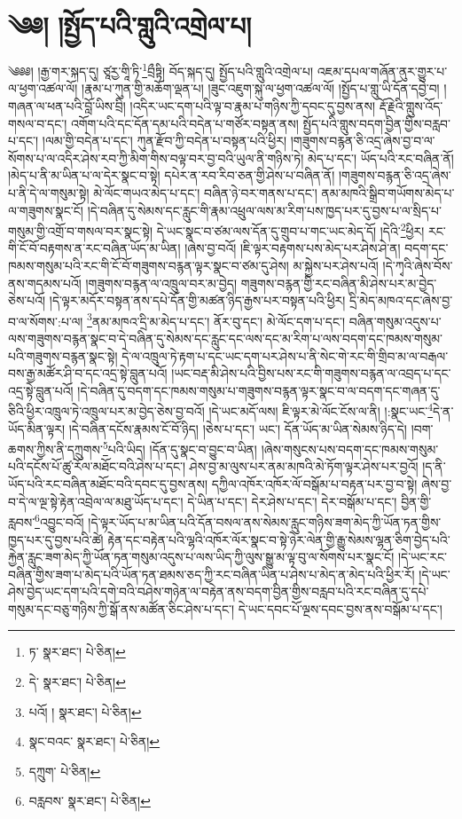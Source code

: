 \setcounter{footnote}{0} 
\chapter{༄༅། །སྤྱོད་པའི་གླུའི་འགྲེལ་པ།}༄༅༅། །རྒྱ་གར་སྐད་དུ། ཙཱརྱ་གཱི་ཏི་\footnote{ཏ་  སྣར་ཐང་།  པེ་ཅིན། }བྲྀཏྟི། བོད་སྐད་དུ། སྤྱོད་པའི་གླུའི་འགྲེལ་པ། འཇམ་དཔལ་གཞོན་ནུར་གྱུར་པ་ལ་ཕྱག་འཚལ་ལོ། །རྣམ་པ་ཀུན་གྱི་མཆོག་ལྡན་པ། །ཟུང་འཇུག་སྐུ་ལ་ཕྱག་འཚལ་ལོ། །སྤྱོད་པ་གླུ་ཡི་དོན་དབྱེ་བ། །གཞན་ལ་ཕན་པའི་བློ་ཡིས་བྲི། །འདིར་ཡང་དག་པའི་ལྟ་བ་རྣམ་པ་གཉིས་ཀྱི་དབང་དུ་བྱས་ནས། རྡོ་རྗེའི་གླུས་འོད་གསལ་བ་དང་། འགོག་པའི་དང་དོན་དམ་པའི་བདེན་པ་གཙོར་བསྟན་ནས། སྤྱོད་པའི་གླུས་བདག་བྱིན་གྱིས་བརླབ་པ་དང་། །ལམ་གྱི་བདེན་པ་དང་། ཀུན་རྫོབ་ཀྱི་བདེན་པ་བསྟན་པའི་ཕྱིར། །གཟུགས་བརྙན་ཅི་འདྲ་ཞེས་བྱ་བ་ལ་སོགས་པ་ལ་འདིར་ཤེས་རབ་ཀྱི་མིག་གིས་བལྟ་བར་བྱ་བའི་ཡུལ་ནི་གཉིས་ཏེ། མེད་པ་དང་། ཡོད་པའི་རང་བཞིན་ནོ། །མེད་པ་ནི་མ་ཡིན་པ་ལ་དེར་སྣང་བ་སྟེ། དཔེར་ན་རབ་རིབ་ཅན་གྱི་ཤེས་པ་བཞིན་ནོ། །གཟུགས་བརྙན་ཅི་འདྲ་ཞེས་པ་ནི་དེ་ལ་གསུམ་སྟེ། མེ་ལོང་གཡའ་མེད་པ་དང་། བཞིན་ཉེ་བར་གནས་པ་དང་། ནམ་མཁའི་སྒྲིབ་གཡོགས་མེད་པ་ལ་གཟུགས་སྣང་ངོ། །དེ་བཞིན་དུ་སེམས་དང་རླུང་གི་རྣམ་འཕྲུལ་ལས་མ་རིག་པས་ཁྱད་པར་དུ་བྱས་པ་ལ་སྲིད་པ་གསུམ་གྱི་འགྲོ་བ་གསལ་བར་སྣང་སྟེ། དེ་ཡང་སྣང་བ་ཙམ་ལས་དོན་དུ་གྲུབ་པ་གང་ཡང་མེད་དོ། །དེའི་\footnote{དེ་  སྣར་ཐང་།  པེ་ཅིན། }ཕྱིར། རང་གི་ངོ་བོ་བརྟགས་ན་རང་བཞིན་ཡོད་མ་ཡིན། །ཞེས་བྱ་བའོ། །ཇི་ལྟར་བརྟགས་པས་མེད་པར་ཤེས་ཤེ་ན། བདག་དང་ཁམས་གསུམ་པའི་རང་གི་ངོ་བོ་གཟུགས་བརྙན་ལྟར་སྣང་བ་ཙམ་དུ་ཤེས། མ་སྐྱེས་པར་ཤེས་པའོ། །དེ་ཀྭའི་ཞེས་བོས་ནས་གདམས་པའོ། །གཟུགས་བརྙན་ལ་འཁྲུལ་བར་མ་བྱེད། གཟུགས་བརྙན་གྱི་རང་བཞིན་མི་ཤེས་པར་མ་བྱེད་ཅེས་པའོ། །དེ་ལྟར་མདོར་བསྟན་ནས་དཔེ་དོན་གྱི་མཚན་ཉིད་རྒྱས་པར་བསྟན་པའི་ཕྱིར། དྲི་མེད་མཁའ་དང་ཞེས་བྱ་བ་ལ་སོགས་:པ་ལ། \footnote{པའོ། །   སྣར་ཐང་།  པེ་ཅིན། }ནམ་མཁའ་དྲི་མ་མེད་པ་དང་། ནོར་བུ་དང་། མེ་ལོང་དག་པ་དང་། བཞིན་གསུམ་འདུས་པ་ལས་གཟུགས་བརྙན་སྣང་བ་དེ་བཞིན་དུ་སེམས་དང་རླུང་དང་ལས་དང་མ་རིག་པ་ལས་བདག་དང་ཁམས་གསུམ་པའི་གཟུགས་བརྙན་སྣང་སྟེ། དེ་ལ་འཁྲུལ་ཏེ་རྟག་པ་དང་ཡང་དག་པར་ཤེས་པ་ནི་སེང་གེ་རང་གི་གྲིབ་མ་ལ་བརྒལ་བས་རྒྱ་མཚོར་ཤི་བ་དང་འདྲ་སྟེ་བླུན་པའོ། །ཡང་བརྡ་མི་ཤེས་པའི་བྱིས་པས་རང་གི་གཟུགས་བརྙན་ལ་འབྲད་པ་དང་འདྲ་སྟེ་བླུན་པའོ། །དེ་བཞིན་དུ་བདག་དང་ཁམས་གསུམ་པ་གཟུགས་བརྙན་ལྟར་སྣང་བ་ལ་བདག་དང་གཞན་དུ་ཅིའི་ཕྱིར་འཁྲུལ་ཏེ་འཁྲུལ་པར་མ་བྱེད་ཅེས་བྱ་བའོ། །དེ་ཡང་མདོ་ལས། ཇི་ལྟར་མེ་ལོང་ངོས་ལ་ནི། །:སྣང་ཡང་\footnote{སྣང་བའང་  སྣར་ཐང་།  པེ་ཅིན། }དེ་ན་ཡོད་མིན་ལྟར། །དེ་བཞིན་དངོས་རྣམས་ངོ་བོ་ཉིད། །ཅེས་པ་དང་། ཡང་། དོན་ཡོད་མ་ཡིན་སེམས་ཉིད་དེ། །བག་ཆགས་ཀྱིས་ནི་དཀྲུགས་\footnote{དཀྲུག་  པེ་ཅིན། }པའི་ཡིད། །དོན་དུ་སྣང་བ་བྱུང་བ་ཡིན། །ཞེས་གསུངས་པས་བདག་དང་ཁམས་གསུམ་པའི་དངོས་པོ་ཚུ་རོལ་མཐོང་བའི་ཤེས་པ་དང་། ཤེས་བྱ་མ་ལུས་པར་ནམ་མཁའི་མེ་ཏོག་ལྟར་ཤེས་པར་བྱའོ། །ད་ནི་ཡོད་པའི་རང་བཞིན་མཐོང་བའི་དབང་དུ་བྱས་ནས། དཀྱིལ་འཁོར་འཁོར་ལོ་བསྒོམ་པ་བརྟན་པར་བྱ་བ་སྟེ། ཞེས་བྱ་བ་དེ་ལ་ལྔ་སྟེ་རྟེན་འབྲེལ་ལ་མཐུ་ཡོད་པ་དང་། དེ་ཡིན་པ་དང་། དེར་ཤེས་པ་དང་། དེར་བསྒོམ་པ་དང་། བྱིན་གྱི་རླབས་\footnote{བརླབས་  སྣར་ཐང་།  པེ་ཅིན། }འབྱུང་བའོ། །དེ་ལྟར་ཡོད་པ་མ་ཡིན་པའི་དོན་བསལ་ནས་སེམས་རླུང་གཉིས་ཟག་མེད་ཀྱི་ཡོན་ཏན་གྱིས་ཁྱད་པར་དུ་བྱས་པའི་ཚེ། རྟེན་དང་བརྟེན་པའི་ལྷའི་འཁོར་ལོར་སྣང་བ་སྟེ་ཉེར་ལེན་གྱི་རྒྱུ་སེམས་ལྷན་ཅིག་བྱེད་པའི་རྐྱེན་རླུང་ཟག་མེད་ཀྱི་ཡོན་ཏན་གསུམ་འདུས་པ་ལས་ཡིད་ཀྱི་ལུས་སྒྱུ་མ་ལྟ་བུ་ལ་སོགས་པར་སྣང་ངོ། །དེ་ཡང་རང་བཞིན་གྱིས་ཟག་པ་མེད་པའི་ཡོན་ཏན་ཐམས་ཅད་ཀྱི་རང་བཞིན་ཡིན་པ་ཤེས་པ་མེད་ན་མེད་པའི་ཕྱིར་རོ། །དེ་ཡང་ཤེས་བྱེད་ཡང་དག་པའི་དགེ་བའི་བཤེས་གཉེན་ལ་བརྟེན་ནས་བདག་བྱིན་གྱིས་བརླབ་པའི་རང་བཞིན་དུ་དཔེ་གསུམ་དང་བཅུ་གཉིས་ཀྱི་སྒོ་ནས་མཚོན་ཅིང་ཤེས་པ་དང་། དེ་ཡང་དབང་པོ་ལྔས་དབང་བྱས་ནས་བསྒོམ་པ་དང་། 